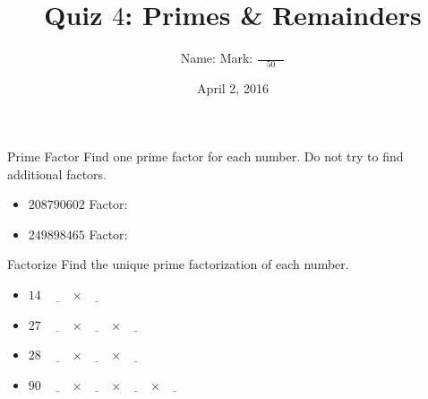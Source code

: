 \documentclass[12pt,letterpaper]{article}
\title{Quiz $4$: Primes \& Remainders}
\author{Name: \underline{\hspace{5cm}} Mark: $\displaystyle \frac{\hspace{3em}}{50}$}
\date{April 2, 2016}
\begin{document}
\maketitle

\thispagestyle{empty}

\begin{problem}{Prime Factor}
 Find one prime factor for each number. Do not try to find additional factors.

 \begin{itemize}
  \item $208790602$ \hfill Factor: \underline{\hspace{2em}}
  \item $249898465$ \hfill Factor: \underline{\hspace{2em}}
 \end{itemize}

\end{problem}

\begin{problem}{Factorize}
 Find the unique prime factorization of each number.

 \begin{itemize}
  \item $14$ \hfill $\underline{\hspace{2em}} \times
  \underline{\hspace{2em}}$
  \item $27$ \hfill $\underline{\hspace{2em}} \times
  \underline{\hspace{2em}} \times \underline{\hspace{2em}}$
  \item $28$ \hfill $\underline{\hspace{2em}} \times
  \underline{\hspace{2em}} \times
  \underline{\hspace{2em}}$
  \item $90$ \hfill $\underline{\hspace{2em}} \times
  \underline{\hspace{2em}} \times \underline{\hspace{2em}}
  \times \underline{\hspace{2em}}$
 \end{itemize}
\end{problem}
\end{document}
